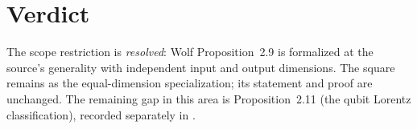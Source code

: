 \documentclass{article}
\begin{document}
\section{Verdict}

The scope restriction is \emph{resolved}: Wolf Proposition~2.9 is formalized at
the source's generality with independent input and output dimensions.  The
square  remains as the
equal-dimension specialization; its statement and proof are unchanged.  The
remaining gap in this area is Proposition~2.11 (the qubit Lorentz
classification), recorded separately in
.



\end{document}
